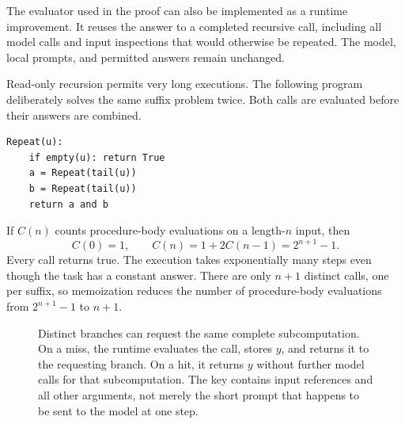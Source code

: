 \documentclass[11pt,twoside]{article}
\theoremstyle{definition}
\theoremstyle{remark}
\begin{document}
The evaluator used in the proof can also be implemented as a runtime
improvement. It reuses the answer to a completed recursive call, including
all model calls and input inspections that would otherwise be repeated.
The model, local prompts, and permitted answers remain unchanged.

Read-only recursion permits very long executions. The following program
deliberately solves the same suffix problem twice. Both calls are evaluated
before their answers are combined.
\begin{lstlisting}
Repeat(u):
    if empty(u): return True
    a = Repeat(tail(u))
    b = Repeat(tail(u))
    return a and b
\end{lstlisting}
If $C(n)$ counts procedure-body evaluations on a length-$n$ input, then
\begin{equation}
 C(0)=1,\qquad C(n)=1+2C(n-1)=2^{n+1}-1.
 \label{eq:repeat-cost}
\end{equation}
Every call returns true. The execution takes exponentially many steps even
though the task has a constant answer. There are only $n+1$ distinct calls,
one per suffix, so memoization reduces the number of procedure-body
evaluations from $2^{n+1}-1$ to $n+1$.

\begin{figure}[htbp]
\centering
{}
\caption{Distinct branches can request the same complete subcomputation.
On a miss, the runtime evaluates the call, stores $y$, and returns it to
the requesting branch. On a hit, it returns $y$ without further model
calls for that subcomputation. The key
contains input references and all other arguments, not merely the short
prompt that happens to be sent to the model at one step.}
\label{fig:call-cache}
\end{figure}
\end{document}
